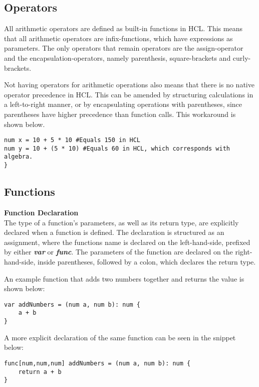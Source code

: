 \subsection{Operators}
All arithmetic operators are defined as built-in functions in HCL.
This means that all arithmetic operators are infix-functions, which have expressions as parameters. 
The only operators that remain operators are the assign-operator and the encapsulation-operators, namely parenthesis, square-brackets and curly-brackets.

Not having operators for arithmetic operations also means that there is no native operator precedence in HCL.
This can be amended by structuring calculations in a left-to-right manner, or by encapsulating operations with parentheses, since parentheses have higher precedence than function calls. 
This workaround is shown below.

\begin{lstlisting}[language=HCL,firstnumber=1]
num x = 10 + 5 * 10 #Equals 150 in HCL
num y = 10 + (5 * 10) #Equals 60 in HCL, which corresponds with algebra.
}
\end{lstlisting}

\subsection{Functions}
\textbf{Function Declaration}\\
The type of a function's parameters, as well as its return type, are explicitly declared when a function is defined. 
The declaration is structured as an assignment, where the functions name is declared on the left-hand-side, prefixed by either \textbf{\textit{var}} or \textbf{\textit{func}}. 
The parameters of the function are declared on the right-hand-side, inside parentheses, followed by a colon, which declares the return type. 

An example function that adds two numbers together and returns the value is shown below:
\begin{lstlisting}[language=HCL,label=lis:addNumbers,firstnumber=1]
var addNumbers = (num a, num b): num {
    a + b
}
\end{lstlisting} 
A more explicit declaration of the same function can be seen in the snippet below:
\begin{lstlisting}[language=HCL,label=lis:hclExplicitTypeDcls,firstnumber=1]
func[num,num,num] addNumbers = (num a, num b): num {
	return a + b
}
\end{lstlisting}

